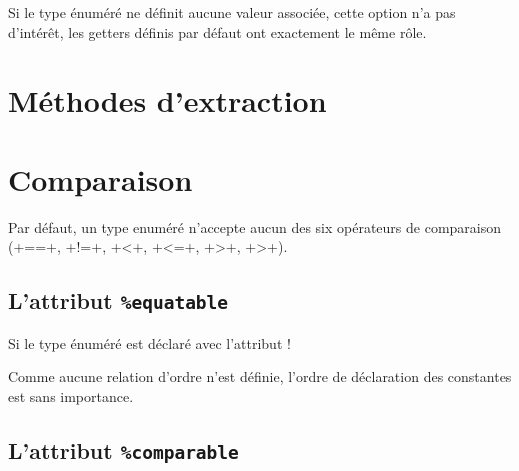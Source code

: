 Si le type énuméré ne définit aucune valeur associée, cette option n'a pas d'intérêt, les getters définis par défaut ont exactement le même rôle.












\section{Méthodes d'extraction}












\section{Comparaison}

Par défaut, un type enuméré n'accepte aucun des six opérateurs de comparaison (\ggsq+==+, \ggsq+!=+, \ggsq+<+, \ggsq+<=+, \ggsq+>+, \ggsq+>+).

\subsection{L'attribut \texttt{\%equatable}}

Si le type énuméré est déclaré avec l'attribut \ggsq!%

Comme aucune relation d'ordre n'est définie, l'ordre de déclaration des constantes est sans importance.




\subsection{L'attribut \texttt{\%comparable}}

